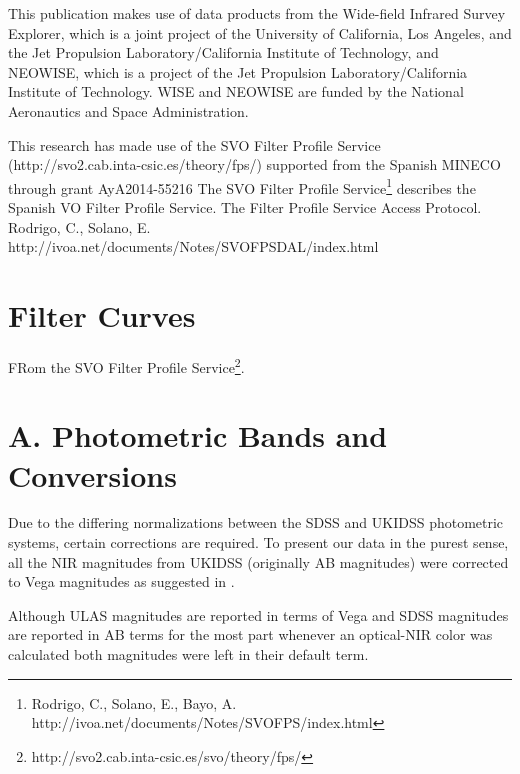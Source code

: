 \documentclass[usenatbib]{mnras}
\begin{document}
This publication makes use of data products from the Wide-field
Infrared Survey Explorer, which is a joint project of the University
of California, Los Angeles, and the Jet Propulsion
Laboratory/California Institute of Technology, and NEOWISE, which is a
project of the Jet Propulsion Laboratory/California Institute of
Technology. WISE and NEOWISE are funded by the National Aeronautics
and Space Administration.

This research has made use of the SVO Filter Profile Service
(http://svo2.cab.inta-csic.es/theory/fps/) supported from the Spanish
MINECO through grant AyA2014-55216 
The SVO Filter Profile Service\footnote{Rodrigo, C., Solano, E., Bayo, A. http://ivoa.net/documents/Notes/SVOFPS/index.html}
describes the Spanish VO Filter Profile Service. 
The Filter Profile Service Access Protocol. Rodrigo, C., Solano, E. http://ivoa.net/documents/Notes/SVOFPSDAL/index.html

\newpage

\appendix
\section{Filter Curves} 
FRom the SVO Filter Profile Service\footnote{http://svo2.cab.inta-csic.es/svo/theory/fps/}.

\section{A. Photometric Bands and Conversions}
    Due to the differing normalizations between the
    SDSS and  UKIDSS photometric systems, certain corrections are required.  To present
    our data in the  purest sense, all the NIR magnitudes from UKIDSS
    (originally AB magnitudes)  were corrected to Vega magnitudes as
    suggested in \citet{Hewett2006}.
    
    Although ULAS magnitudes are reported in terms of Vega and SDSS
    magnitudes are reported in AB terms for the most part whenever an
    optical-NIR color was calculated both magnitudes were left in their
    default term.
    
\end{document}
